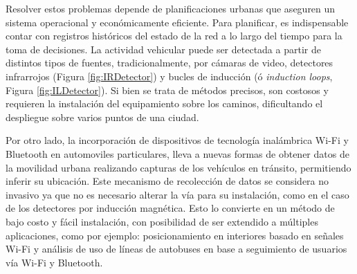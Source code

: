 Resolver estos problemas depende de planificaciones urbanas que aseguren un sistema operacional y económicamente eficiente. Para planificar, es indispensable contar con registros históricos del estado de la red a lo largo del tiempo para la toma de decisiones. La actividad vehicular puede ser detectada a partir de distintos tipos de fuentes, tradicionalmente, por cámaras de video, detectores infrarrojos (Figura \ref{fig:IRDetector}) y bucles de inducción (ó \textit{induction loops}, Figura \ref{fig:ILDetector}). Si bien se trata de métodos precisos, son costosos y requieren la instalación del equipamiento sobre los caminos, dificultando el despliegue sobre varios puntos de una ciudad.

Por otro lado, la incorporación de dispositivos de tecnología inalámbrica Wi-Fi y Bluetooth en automoviles particulares, lleva a nuevas formas de obtener datos de la movilidad urbana realizando capturas de los vehículos en tránsito, permitiendo inferir su ubicación. Este mecanismo de recolección de datos se considera no invasivo ya que no es necesario alterar la vía para su instalación, como en el caso de los detectores por inducción magnética. Esto lo convierte en un método de bajo costo y fácil instalación, con posibilidad de ser extendido a múltiples aplicaciones, como por ejemplo: posicionamiento en interiores basado en señales Wi-Fi\cite{jekabsons2011analysis} y análisis de uso de líneas de autobuses en base a seguimiento de usuarios vía Wi-Fi y Bluetooth\cite{dunlap2016estimation}. 

